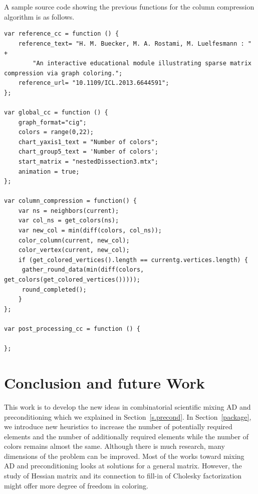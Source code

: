 \documentclass[12pt, twoside,a4paper,toc=bibliography]{scrbook}
\newcommand{\secref}[1]{Section~\protect\ref{#1}}
\begin{document}
A sample source code showing the previous functions for the column compression algorithm is as follows.
\begin{lstlisting}
var reference_cc = function () {
    reference_text= "H. M. Buecker, M. A. Rostami, M. Luelfesmann : " +
        "An interactive educational module illustrating sparse matrix compression via graph coloring.";
    reference_url= "10.1109/ICL.2013.6644591";
};

var global_cc = function () {
    graph_format="cig";
    colors = range(0,22);
    chart_yaxis1_text = "Number of colors";
    chart_group5_text = 'Number of colors';
    start_matrix = "nestedDissection3.mtx";
    animation = true;
};

var column_compression = function() {
    var ns = neighbors(current);
    var col_ns = get_colors(ns);
    var new_col = min(diff(colors, col_ns));
    color_column(current, new_col);
    color_vertex(current, new_col);
    if (get_colored_vertices().length == currentg.vertices.length) {
     gather_round_data(min(diff(colors, get_colors(get_colored_vertices()))));
     round_completed();
    }
};

var post_processing_cc = function () {

};
\end{lstlisting}

\chapter{Conclusion and future Work}
\label{conc}
This work is to develop the new ideas in combinatorial scientific mixing AD and preconditioning which we explained in \secref{s.precond}.
In \secref{package}, we introduce new heuristics to increase the number of potentially required elements and the number of additionally required
elements while the number of colors remains almost the same.
Although there is much research, many dimensions of the problem can be improved. Most of the works toward mixing AD and preconditioning looks at solutions for a general matrix. However, the study of Hessian matrix and its connection to fill-in of Cholesky factorization might offer more degree of freedom in coloring.
\end{document}
